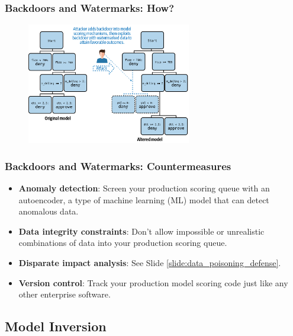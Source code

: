 \documentclass[11pt,
               aspectratio=169,
               hyperref={colorlinks}
               ]{beamer}
\begin{document}
			\begin{frame}
		
				\frametitle{Backdoors and Watermarks: \textbf{How?}}		
			
				\begin{figure}[htb]
					\begin{center}
						\includegraphics[height=150pt]{../img/backdoor.png}
					\end{center}
				\end{figure}	
			

			\end{frame}
		
			\begin{frame}[label={slide:watermark_defense}]
		
				\frametitle{Backdoors and Watermarks: \textbf{Countermeasures}}
				\begin{itemize}
				\item \textbf{Anomaly detection}: Screen your production scoring queue with an autoencoder, a type of machine learning (ML) model that can detect anomalous data. 
				\item \textbf{Data integrity constraints}: Don’t allow impossible or unrealistic combinations of data into your production scoring queue.
				\item \textbf{Disparate impact analysis}: See Slide \ref{slide:data_poisoning_defense}.
				\item \textbf{Version control}: Track your production model scoring code just like any other enterprise software.
				\end{itemize}
				
			\end{frame}


		\subsection{Model Inversion}
			
\end{document}
